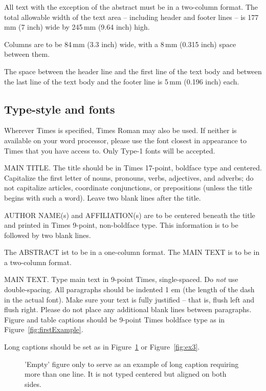 All text with the exception of the abstract must be in a two-column format.
The total allowable width of the text area -- including header and footer
lines -- is 177\,mm (7 inch) wide by 245\,mm (9.64 inch) high.

Columns are to be 84\,mm (3.3 inch) wide, with a 8\,mm (0.315 inch) space 
between them.

The space between the header line and the first line of the text body and
between the last line of the text body and the footer line is 5\,mm
(0.196 inch) each.

\subsection{Type-style and fonts}

Wherever Times is specified, Times Roman may also be used. If
neither is available on your word processor, please use the font
closest in appearance to Times that you have access to. Only
Type-1 fonts will be accepted.

MAIN TITLE. The title should be in Times 17-point, boldface type and
centered. Capitalize the first letter of nouns, pronouns, verbs, adjectives,
and adverbs; do not capitalize articles, coordinate conjunctions, or
prepositions (unless the title begins with such a word). Leave two blank
lines after the title.

AUTHOR NAME(s) and AFFILIATION(s) are to be centered beneath the title and
printed in Times 9-point, non-boldface type. This information is to be
followed by two blank lines.

The ABSTRACT ist to be in a one-column format. The MAIN TEXT is to be in a
two-column format.

MAIN TEXT. Type main text in 9-point Times, single-spaced. Do \emph{not} use
double-spacing. All paragraphs should be indented 1 em (the length of the
dash in the actual font). Make sure your text is fully justified -- that is,
flush left and flush right. Please do not place any additional blank lines
between paragraphs. Figure and table captions should be 9-point Times
boldface type as in Figure~\ref{fig:firstExample}.

\noindent Long captions should be set as in Figure~\ref{fig:ex1} or
Figure~\ref{fig:ex3}.

\begin{figure}[htb]
   \caption{\label{fig:ex1}
     'Empty' figure only to serve as an example of long caption requiring 
     more than one line. It is not typed centered but aligned on both sides.}
\end{figure}

